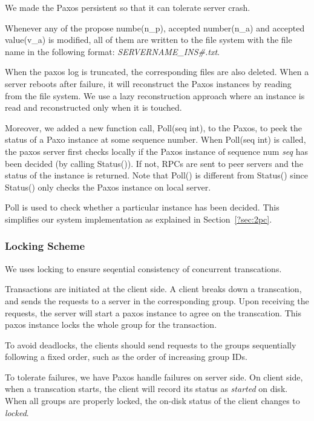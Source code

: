 \documentclass{vldb}
\begin{document}
We made the Paxos persistent so that it can tolerate server crash.

Whenever any of the propose numbe(n\_p), accepted number(n\_a) and accepted value(v\_a)
is modified, all of them are written to the file system with the file name in the
following format: \textit{SERVERNAME\_INS\#.txt}.

When the paxos log is truncated, the corresponding files are also deleted. When a
server reboots after failure, it will reconstruct the Paxos instances by reading from
the file system. We use a lazy reconstruction approach where an instance is read and
reconstructed only when it is touched.

Moreover, we added a new function call, Poll(seq int), to the Paxos, to peek the
status of a Paxo instance at some sequence number. When Poll(seq int) is called, the
paxos server first checks locally if the Paxos instance of sequence num \textit{seq}
has been decided (by calling Status()). If not, RPCs are sent to peer servers and the
status of the instance is returned. Note that Poll() is different from Status() since
Status() only checks the Paxos instance on local server.

Poll is used to check whether a particular instance has been decided. This simplifies
our system implementation as explained in Section~\ref{?sec:2pc}.


\subsubsection{Locking Scheme}
\label{sec:lock}

We uses locking to ensure seqential consistency of concurrent transcations.

Transactions are initiated at the client side. A client breaks down a transcation,
and sends the requests to a server in the corresponding group. Upon receiving the
requests, the server will start a paxos instance to agree on the transcation. This
paxos instance locks the whole group for the transaction.

To avoid deadlocks, the clients should send requests to the groups sequentially
following a fixed order, such as the order of increasing group IDs.

To tolerate failures, we have Paxos handle failures on server side. On client side,
when a transcation starts, the client will record its status as \textit{started} on
disk. When all groups are properly locked, the on-disk status of the client changes
to \textit{locked}.
\end{document}
